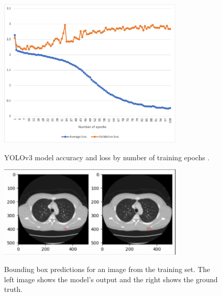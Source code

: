 




\begin{figure}
 \begin{center}
 \includegraphics[width=3.5in]{images/epochgraph.jpg}\\
 \caption{YOLOv3 model accuracy and loss by number of training epochs \cite{radiology_error}.}\label{fig:compare}
 \end{center}
\end{figure}

\begin{figure}
 \begin{center}
 \includegraphics[width=3.5in]{images/training performance.PNG}\\
 \caption{Bounding box predictions for an image from the training set. The left image shows the model's output and the right shows the ground truth.}\label{fig:training}
 \end{center}
\end{figure}

